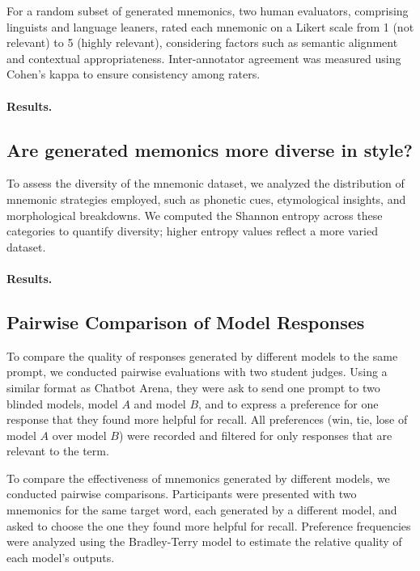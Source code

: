 \documentclass[11pt, onecolumn]{article}
\newcounter{para}
\begin{document}
For a random subset of generated mnemonics, two human evaluators, comprising linguists and language leaners, rated each mnemonic on a Likert scale from 1 (not relevant) to 5 (highly relevant), considering factors such as semantic alignment and contextual appropriateness. Inter-annotator agreement was measured using Cohen's kappa to ensure consistency among raters.

\paragraph{Results.}

\subsection{Are generated memonics more diverse in style?} \label{sec:diverse-style}

To assess the diversity of the mnemonic dataset, we analyzed the distribution of mnemonic strategies employed, such as phonetic cues, etymological insights, and morphological breakdowns. We computed the Shannon entropy across these categories to quantify diversity; higher entropy values reflect a more varied dataset.

\paragraph{Results.}

\subsection{Pairwise Comparison of Model Responses} \label{sec:model-comparison}


To compare the quality of responses generated by different models to the same prompt, we conducted pairwise evaluations with two student judges. Using a similar format as Chatbot Arena, they were ask to send one prompt to two blinded models, model $A$ and model $B$, and to express a preference for one response that they found more helpful for recall. All preferences (win, tie, lose of model $A$ over model $B$) were recorded and filtered for only responses that are relevant to the term.

To compare the effectiveness of mnemonics generated by different models, we conducted pairwise comparisons. Participants were presented with two mnemonics for the same target word, each generated by a different model, and asked to choose the one they found more helpful for recall. Preference frequencies were analyzed using the Bradley-Terry model to estimate the relative quality of each model's outputs.
\end{document}
